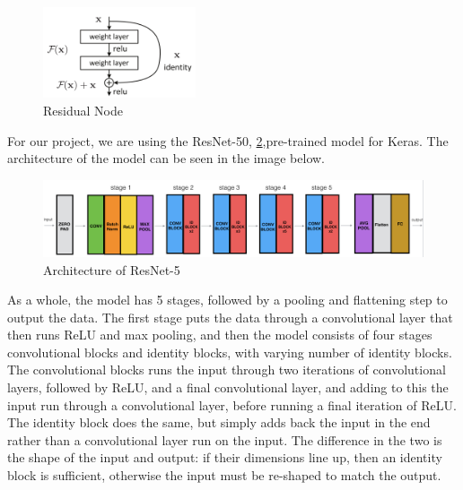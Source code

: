 \documentclass[10pt,twocolumn,letterpaper]{article}
\begin{document}
        \begin{figure}[h]
            \centering
            \includegraphics[width=0.4\textwidth]{./images/residual.png}
            \caption{Residual Node}
            \label{fig:struct-cnn-residual}
        \end{figure}
    
        For our project, we are using the ResNet-50, \ref{fig:struct-cnn-resnet},pre-trained model for Keras. The architecture of the model can be seen in the image below.
    
        \begin{figure}
            \begin{center}
                \includegraphics[width=\textwidth]{./images/Resnet-50.png}
            \end{center}
            \caption{Architecture of ResNet-5}
            \label{fig:struct-cnn-resnet}
        \end{figure}
    
         As a whole, the model has 5 stages, followed by a pooling and flattening step to output the data. The first stage puts the data through a convolutional layer that then runs ReLU and max pooling, and then the model consists of four stages convolutional blocks and identity blocks, with varying number of identity blocks. The convolutional blocks runs the input through two iterations of convolutional layers, followed by ReLU, and a final convolutional layer, and adding to this the input run through a convolutional layer, before running a final iteration of ReLU. The identity block does the same, but simply adds back the input in the end rather than a convolutional layer run on the input. The difference in the two is the shape of the input and output: if their dimensions line up, then an identity block is sufficient, otherwise the input must be re-shaped to match the output.
\end{document}
